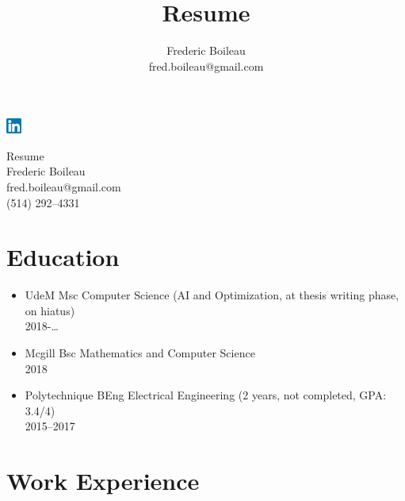 \documentclass{article}
\title{Resume}
\author{Frederic Boileau\\[1em] fred.boileau@gmail.com}
\begin{document}
\pagestyle{empty}

\null\hfill\href{https://www.linkedin.com/in/frederic-boileau/}{\includegraphics[width=5mm]{linkedin.png}}
\begin{center}
  Resume\\
  Frederic Boileau\\
  fred.boileau@gmail.com\\
  (514) 292--4331
\end{center}

\section*{Education}

\begin{itemize}
  \item UdeM Msc Computer Science (AI and Optimization, at thesis writing phase, on hiatus)\\ 2018-\ldots
  \item Mcgill Bsc Mathematics and Computer Science\\
    2018
  \item Polytechnique BEng Electrical Engineering (2 years, not completed, GPA: 3.4/4)\\ 2015--2017
\end{itemize}


\section*{Work Experience}
\end{document}
